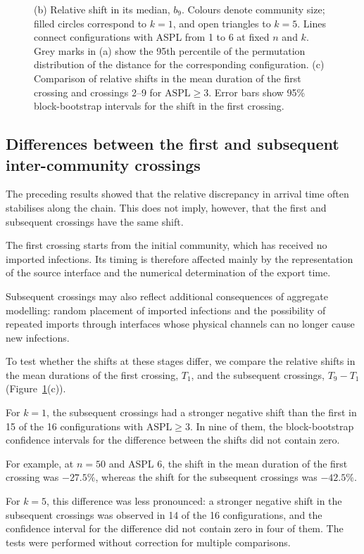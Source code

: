 \documentclass[a4paper,fleqn]{cas-sc}
\begin{document}
\begin{figure}[tbp]
{(b) Relative shift in its median, $b_9$.
Colours denote community size; filled circles correspond to $k=1$, and open triangles to $k=5$.
Lines connect configurations with ASPL from 1 to 6 at fixed $n$ and $k$. Grey marks in (a) show the 95th percentile of the permutation distribution of the distance for the corresponding configuration.
(c) Comparison of relative shifts in the mean duration of the first crossing and crossings 2--9 for $\mathrm{ASPL}\geq3$.
Error bars show 95\% block-bootstrap intervals for the shift in the first crossing.
}
\label{fig:descriptor}
\end{figure}


\subsection{Differences between the first and subsequent inter-community crossings}

The preceding results showed that the relative discrepancy in arrival time often stabilises along the chain. This does not imply, however, that the first and subsequent crossings have the same shift.

The first crossing starts from the initial community, which has received no imported infections. Its timing is therefore affected mainly by the representation of the source interface and the numerical determination of the export time.

Subsequent crossings may also reflect additional consequences of aggregate modelling: random placement of imported infections and the possibility of repeated imports through interfaces whose physical channels can no longer cause new infections.

To test whether the shifts at these stages differ, we compare the relative shifts in the mean durations of the first crossing, $T_1$, and the subsequent crossings, $T_9-T_1$ (Figure~\ref{fig:descriptor}(c)).

For $k=1$, the subsequent crossings had a stronger negative shift than the first in 15 of the 16 configurations with $\mathrm{ASPL}\geq3$. In nine of them, the block-bootstrap confidence intervals for the difference between the shifts did not contain zero.

For example, at $n=50$ and ASPL 6, the shift in the mean duration of the first crossing was $-27.5\%$, whereas the shift for the subsequent crossings was $-42.5\%$.

For $k=5$, this difference was less pronounced: a stronger negative shift in the subsequent crossings was observed in 14 of the 16 configurations, and the confidence interval for the difference did not contain zero in four of them. The tests were performed without correction for multiple comparisons.
\end{document}
